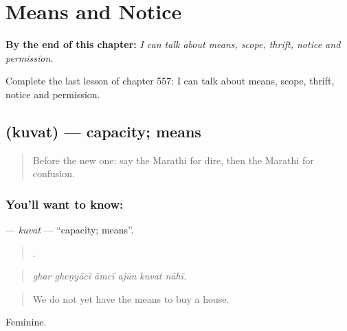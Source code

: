 
\chapter{Means and Notice}
\label{ch:mr-means-and-notice}

\begin{chapteropening}
\textbf{By the end of this chapter:} \emph{I can talk about means, scope, thrift, notice and permission.}

Complete the last lesson of chapter 557: I can talk about means, scope, thrift, notice and permission.
\end{chapteropening}

\section[\texorpdfstring{\mr{कुवत} (kuvat)}{कुवत (kuvat)}]{ (kuvat) — capacity; means}

\label{lesson:MR-C557-kuvat}



\begin{quote}
Before the new one: say the Marathi for dire, then the Marathi for confusion.
\end{quote}

\subsection*{You'll want to know: }
\textbf{} — \emph{kuvat} — \textquotedblleft{}capacity; means\textquotedblright{}.

\begin{quote}
     .
\end{quote}

\begin{quote}
\emph{ghar gheṇyācī āmcī ajūn kuvat nāhī.}
\end{quote}

\begin{quote}
We do not yet have the means to buy a house.
\end{quote}

Feminine.

